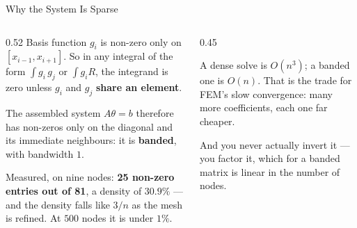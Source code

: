 \begin{frame}{Why the System Is Sparse}
\begin{columns}[T]
\begin{column}{0.52\textwidth}
\small
Basis function $g_i$ is non-zero only on $[x_{i-1},x_{i+1}]$. So in any integral of the form $\int g_i\,g_j$ or $\int g_i R$, the integrand is zero unless $g_i$ and $g_j$ \textbf{share an element}.
\medskip

The assembled system $A\theta=b$ therefore has non-zeros only on the diagonal and its immediate neighbours: it is \textbf{banded}, with bandwidth $1$.
\medskip

Measured, on nine nodes: \textbf{25 non-zero entries out of 81}, a density of $30.9\%$ --- and the density falls like $3/n$ as the mesh is refined. At $500$ nodes it is under $1\%$.
\end{column}
\begin{column}{0.45\textwidth}
\begin{conceptbox}[title=\textbf{What sparsity buys}]\small
A dense solve is $O(n^{3})$; a banded one is $O(n)$. That is the trade for FEM's slow convergence: many more coefficients, each one far cheaper.
\end{conceptbox}
\medskip
\begin{examplebox}\footnotesize
And you never actually invert it --- you factor it, which for a banded matrix is linear in the number of nodes.
\end{examplebox}
\end{column}
\end{columns}
\vspace{1mm}
\end{frame}

